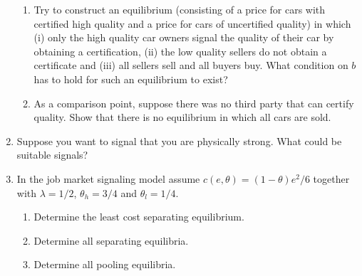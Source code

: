 \documentclass[a4paper,12pt]{article}
\begin{document}
\begin{enumerate}[resume]
  \begin{enumerate}
\item Try to construct an equilibrium (consisting of a price for cars with certified high quality and a price for cars of uncertified quality) in which (i) only the high quality car owners signal the quality of their car by obtaining a certification, (ii) the low quality sellers do not obtain a certificate and (iii) all sellers sell and all buyers buy. What condition on $b$ has to hold for such an equilibrium to exist?
\item As a comparison point, suppose there was no third party that can certify quality. Show that there is no equilibrium in which all cars are sold.
  \end{enumerate}
\item Suppose you want to signal that you are physically strong. What could be suitable signals?
\item In the job market signaling model assume $c(e,\theta )=(1-\theta) e^2/6$ together with $\lambda=1/2$, $\theta _h=3/4$ and $\theta _l=1/4$.
  \begin{enumerate}
  \item Determine the least cost separating equilibrium.
  \item Determine all separating equilibria.
  \item Determine all pooling equilibria.

\end{enumerate}
\end{enumerate}
\end{document}
